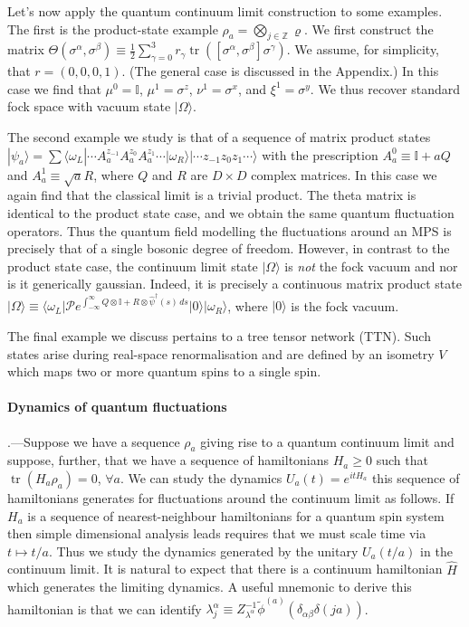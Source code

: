 \documentclass[prl,twocolumn,lengthcheck,superscriptaddress]{revtex4-1}
\newcommand{\tr}{\operatorname{tr}}
\theoremstyle{definition}
\theoremstyle{remark}
\begin{document}
Let's now apply the quantum continuum limit construction to some examples. The first is the product-state example $\rho_a = \bigotimes_{j\in\mathbb{Z}}\varrho$. We first construct the matrix $\Theta(\sigma^\alpha,\sigma^\beta) \equiv \frac12\sum_{\gamma=0}^3 r_\gamma \tr([\sigma^\alpha,\sigma^\beta]\sigma^\gamma)$. We assume, for simplicity, that $r = (0,0,0,1)$. (The general case is discussed in the Appendix.) In this case we find that $\mu^0 = \mathbb{I}$, $\mu^1 = \sigma^z$, $\nu^1 = \sigma^x$, and $\xi^1 = \sigma^y$. We thus recover standard fock space with vacuum state $|\Omega\rangle$.

The second example we study is that of a sequence of matrix product states $|\psi_a\rangle = \sum\langle \omega_L| \cdots A^{z_{-1}}_aA^{z_{0}}_a A^{z_{1}}_a\cdots |\omega_R\rangle |\cdots z_{-1}z_0z_{1} \cdots \rangle$
with the prescription $A^0_a \equiv \mathbb{I} + a Q$ and $A^1_a \equiv \sqrt{a} R$, where $Q$ and $R$ are $D\times D$ complex matrices. In this case we again find that the classical limit is a trivial product. The theta matrix is identical to the product state case, and we obtain the same quantum fluctuation operators. Thus the quantum field modelling the fluctuations around an MPS is precisely that of a single bosonic degree of freedom. However, in contrast to the product state case, the continuum limit state $|\Omega\rangle$ is \emph{not} the fock vacuum and nor is it generically gaussian. Indeed, it is precisely a continuous matrix product state $|\Omega\rangle \equiv \langle\omega_L|\mathcal{P}e^{\int_{-\infty}^\infty Q\otimes\mathbb{I} + R\otimes \widehat{\psi}^\dag(s)\,ds}|0\rangle|\omega_R\rangle$,  where $|0\rangle$ is the fock vacuum. 

The final example we discuss pertains to a tree tensor network (TTN). Such states arise during real-space renormalisation and are defined by an isometry $V$ which maps two or more quantum spins to a single spin.

\paragraph{Dynamics of quantum fluctuations}\hspace{-1em}.---Suppose we have a sequence $\rho_a$ giving rise to a quantum continuum limit and suppose, further, that we have a sequence  of hamiltonians $H_a\ge 0$ such that $\tr(H_a\rho_a) = 0$, $\forall a$. We can study the dynamics $U_a(t) = e^{itH_a}$ this sequence of hamiltonians generates for fluctuations around the continuum limit as follows. If $H_a$ is a sequence of nearest-neighbour hamiltonians for a quantum spin system then simple dimensional analysis leads requires that we must scale time via $t\mapsto t/a$. Thus we study the dynamics generated by the unitary $U_a(t/a)$ in the continuum limit. It is natural to expect that there is a continuum hamiltonian $\widehat{H}$ which generates the limiting dynamics. A useful mnemonic to derive this hamiltonian is that we can identify $\lambda^{\alpha}_{j} \equiv {Z_{\lambda^\alpha}^{-1}}\widetilde{\phi}^{(a)}(\delta_{\alpha\beta}\delta(ja))$. 
\end{document}
